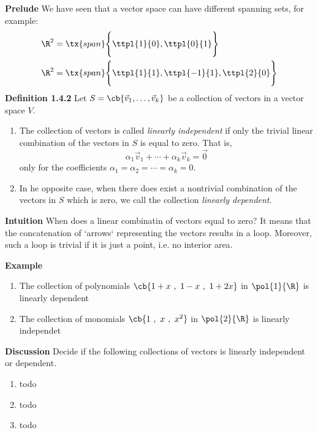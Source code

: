 \documentclass[letterpaper, 10pt]{article}
\begin{document}
\lb
\textbf{Prelude}
\lb
We have seen that a vector space can have different spanning sets, for example:
\begin{align*}
    \R^2 &= \tx{span} \Bigg \{ \ttpl{1}{0}, \ttpl{0}{1} \Bigg \} \\
    \R^2 &= \tx{span} \Bigg \{ \ttpl{1}{1}, \ttpl{-1}{1}, \ttpl{2}{0} \Bigg \}
\end{align*}
\lb
\lb
\lb
\lb
\lb
\lb
\lb
\textbf{Definition 1.4.2}
\lb
Let $S = \cb{\vec v_1, \ldots, \vec v_k} $ be a collection of vectors in a vector space $V$.
\begin{enumerate}
    \item 
        The collection of vectors is called \emph{linearly independent} if only the
        trivial linear combination of the vectors in $S$ is equal to zero.
        \pr
        That is,
        \[ α_1 \vec v_1 + \cdots + α_k \vec v_k = \vec 0 \]
        only for the coefficients $α_1 = α_2 = \cdots = α_k = 0$.
    \item
        In he opposite case, when there does exist a nontrivial combination of the vectors in $S$
        which is zero, we call the collection \emph{linearly dependent}.
\end{enumerate}


\lb
\textbf{Intuition}
\lb
When does a linear combinatin of vectors equal to zero? It means that the concatenation of
`arrows` representing the vectors results in a loop.
\lb
Moreover, such a loop is trivial if it is just a point, i.e. no interior area.



\newpage

\lb
\textbf{Example}
\lb
\begin{enumerate}
    \item The collection of polynomials $ \cb{1+x ~,~ 1-x ~,~ 1+2x}$ in $\pol{1}{\R}$ is linearly
        dependent
    \item The collection of monomials $ \cb{1 ~,~ x ~,~ x^2}$ in $\pol{2}{\R}$ is linearly
        independet
\end{enumerate}


\lb
\textbf{Discussion}
\lb
Decide if the following collections of vectors is linearly independent or dependent.
\begin{enumerate}
    \item todo
    \item todo
    \item todo
\end{enumerate}
\end{document}
